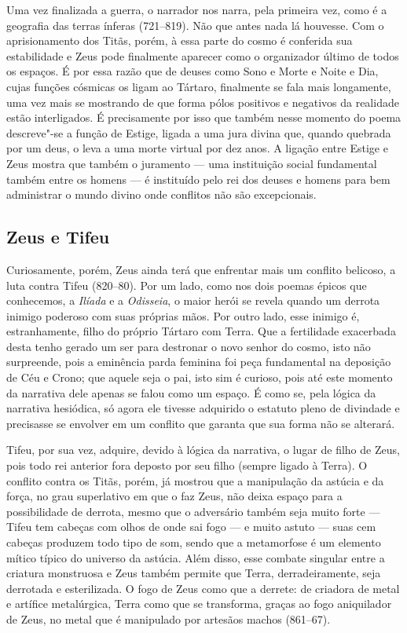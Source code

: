 Uma vez finalizada a guerra, o narrador nos narra, pela primeira vez,
como é a geografia das terras ínferas (721--819). Não que antes nada lá
houvesse. Com o aprisionamento dos Titãs, porém, à essa parte do cosmo é
conferida sua estabilidade e Zeus pode finalmente aparecer como o
organizador último de todos os espaços. É por essa razão que de deuses
como Sono e Morte e Noite e Dia, cujas funções cósmicas os ligam ao
Tártaro, finalmente se fala mais longamente, uma vez mais se mostrando
de que forma pólos positivos e negativos da realidade estão
interligados. É precisamente por isso que também nesse momento do poema
descreve"-se a função de Estige, ligada a uma jura divina que, quando
quebrada por um deus, o leva a uma morte virtual por dez anos. A ligação
entre Estige e Zeus mostra que também o juramento --- uma instituição
social fundamental também entre os homens --- é instituído pelo rei dos
deuses e homens para bem administrar o mundo divino onde conflitos não
são excepcionais.

\subsection{Zeus e Tifeu}

Curiosamente, porém, Zeus ainda terá que enfrentar mais um conflito
belicoso, a luta contra Tifeu (820--80). Por um lado, como nos dois
poemas épicos que conhecemos, a \emph{Ilíada} e a \emph{Odisseia}, o
maior herói se revela quando um derrota inimigo poderoso com suas
próprias mãos. Por outro lado, esse inimigo é, estranhamente, filho do
próprio Tártaro com Terra. Que a fertilidade exacerbada desta tenho
gerado um ser para destronar o novo senhor do cosmo, isto não
surpreende, pois a eminência parda feminina foi peça fundamental na
deposição de Céu e Crono; que aquele seja o pai, isto sim é curioso,
pois até este momento da narrativa dele apenas se falou como um espaço.
É como se, pela lógica da narrativa hesiódica, só agora ele tivesse
adquirido o estatuto pleno de divindade e precisasse se envolver em um
conflito que garanta que sua forma não se alterará.

Tifeu, por sua vez, adquire, devido à lógica da narrativa, o lugar de
filho de Zeus, pois todo rei anterior fora deposto por seu filho (sempre
ligado à Terra). O conflito contra os Titãs, porém, já mostrou que a
manipulação da astúcia e da força, no grau superlativo em que o faz
Zeus, não deixa espaço para a possibilidade de derrota, mesmo que o
adversário também seja muito forte --- Tifeu tem cabeças com olhos de
onde sai fogo --- e muito astuto --- suas cem cabeças produzem todo tipo
de som, sendo que a metamorfose é um elemento mítico típico do universo
da astúcia. Além disso, esse combate singular entre a criatura
monstruosa e Zeus também permite que Terra, derradeiramente, seja
derrotada e esterilizada. O fogo de Zeus como que a derrete: de criadora
de metal e artífice metalúrgica, Terra como que se transforma, graças ao
fogo aniquilador de Zeus, no metal que é manipulado por artesãos machos
(861--67).


